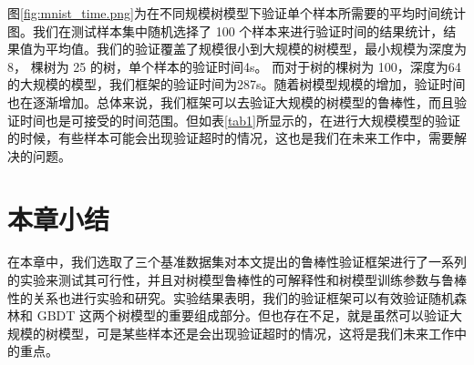 图\ref{fig:mnist_time.png}为在不同规模树模型下验证单个样本所需要的平均时间统计图。我们在测试样本集中随机选择了 100 个样本来进行验证时间的结果统计，结果值为平均值。我们的验证覆盖了规模很小到大规模的树模型，最小规模为深度为 8， 棵树为 25 的树，单个样本的验证时间4s。 而对于树的棵树为 100，深度为64 的大规模的模型，我们框架的验证时间为287s。随着树模型规模的增加，验证时间也在逐渐增加。总体来说，我们框架可以去验证大规模的树模型的鲁棒性，而且验证时间也是可接受的时间范围。但如表\ref{tab1}所显示的，在进行大规模模型的验证的时候，有些样本可能会出现验证超时的情况，这也是我们在未来工作中，需要解决的问题。

\section{本章小结}
在本章中，我们选取了三个基准数据集对本文提出的鲁棒性验证框架进行了一系列的实验来测试其可行性，并且对树模型鲁棒性的可解释性和树模型训练参数与鲁棒性的关系也进行实验和研究。实验结果表明，我们的验证框架可以有效验证随机森林和 GBDT 这两个树模型的重要组成部分。但也存在不足，就是虽然可以验证大规模的树模型，可是某些样本还是会出现验证超时的情况，这将是我们未来工作中的重点。
